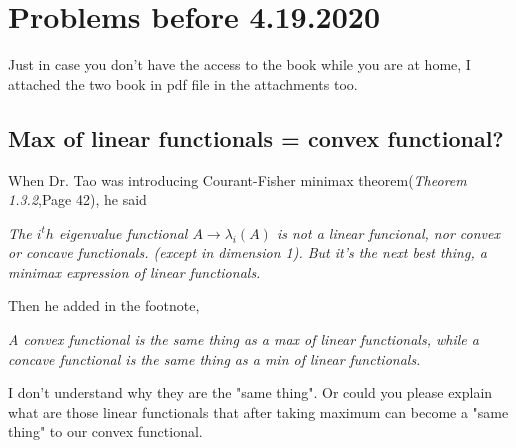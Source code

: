 \section{Problems before 4.19.2020}

Just in case you don't have the access to the book while you are at home, I attached the two book in pdf file in the attachments too.

\subsection{Max of linear functionals = convex functional?}
When Dr. Tao was introducing Courant-Fisher minimax theorem(\textit{Theorem 1.3.2},Page 42), he said 

\textit{The $i^th$ eigenvalue functional $A\to \lambda_i(A)$ is not a linear funcional, nor convex or concave functionals. (except in dimension 1). But it's the next best thing, a minimax expression of linear functionals.}

Then he added in the footnote,

\textit{A convex functional is the same thing as a max of linear functionals, while a concave functional is the same thing as a min of linear functionals.}

I don't understand why they are the "same thing". Or could you please explain what are those linear functionals that after taking maximum can become a "same thing" to our convex functional. 





